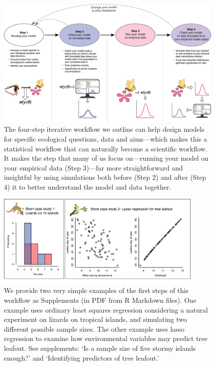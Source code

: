 \documentclass[11pt]{article}
\begin{document}
\newpage

\begin{figure}[ht]
\centering
\noindent \includegraphics[width=1\textwidth]{figures/workflow.png}
\caption{The four-step iterative workflow we outline can help design models for specific ecological questions, data and aims---which makes this a statistical workflow that can naturally become a scientific workflow. It makes the step that many of us focus on---running your model on your empirical data (Step 3)---far more straightforward and insightful by using simulations both before (Step 2) and after (Step 4) it to better understand the model and data together.}
\label{fig:workflow}
\end{figure}

\begin{figure}[ht]
\centering
\noindent \includegraphics[width=0.9\textwidth]{figures/twoexamples.png}
\caption{We provide two very simple examples of the first steps of this workflow as Supplements (in PDF from R Markdown files). One example uses ordinary least squares regression considering a natural experiment on lizards on tropical islands, and simulating two different possible sample sizes. The other example uses lasso regression to examine how environmental variables may predict tree leafout. See supplements: `Is a sample size of five stormy islands enough?' and `Identifying predictors of tree leafout.'}
\label{fig:twoexamples}
\end{figure}
\end{document}
